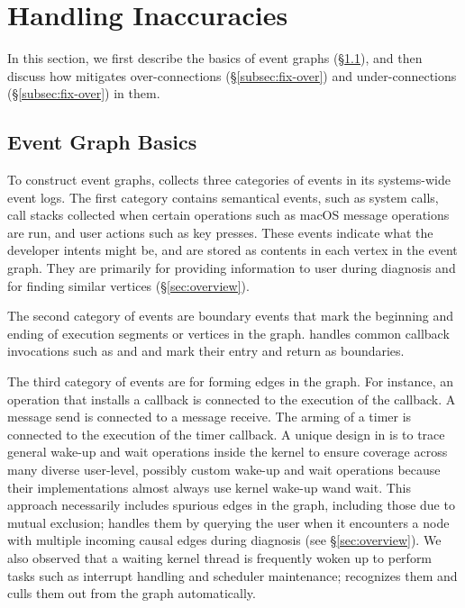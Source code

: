 \section{Handling Inaccuracies}\label{sec:graphcomputing}

In this section, we first describe the basics of \xxx event graphs
(\S\ref{subsec:eventgraph}), and then discuss how \xxx mitigates
over-connections (\S\ref{subsec:fix-over}) and under-connections
(\S\ref{subsec:fix-over}) in them.

\subsection{Event Graph Basics}\label{subsec:eventgraph}

To construct event graphs, \xxx collects three categories of events in its
systems-wide event logs.  The first category contains semantical events,
such as system calls, call stacks collected when certain operations such
as macOS message operations are run, and user actions such as key presses.
These events indicate what the developer intents might be, and are stored
as contents in each vertex in the event graph.  They are primarily for
providing information to user during diagnosis and for finding similar
vertices (\S\ref{sec:overview}).

The second category of events are boundary events that mark the beginning
and ending of execution segments or vertices in the graph.  \xxx handles
common callback invocations such as  and
 and mark their entry and return as boundaries.

The third category of events are for forming edges in the graph.  For
instance, an operation that installs a callback is connected to the
execution of the callback.  A message send is connected to a message
receive.  The arming of a timer is connected to the execution of the timer
callback.  A unique design in \xxx is to trace general wake-up and wait
operations inside the kernel to ensure coverage across many diverse
user-level, possibly custom wake-up and wait operations because their
implementations almost always use kernel wake-up wand wait.  This approach
necessarily includes spurious edges in the graph, including those due to
mutual exclusion; \xxx handles them by querying the user when it
encounters a node with multiple incoming causal edges during diagnosis
(see \S\ref{sec:overview}).  We also observed that a waiting kernel thread
is frequently woken up to perform tasks such as interrupt handling and
scheduler maintenance; \xxx recognizes them and culls them out from the
graph automatically.

